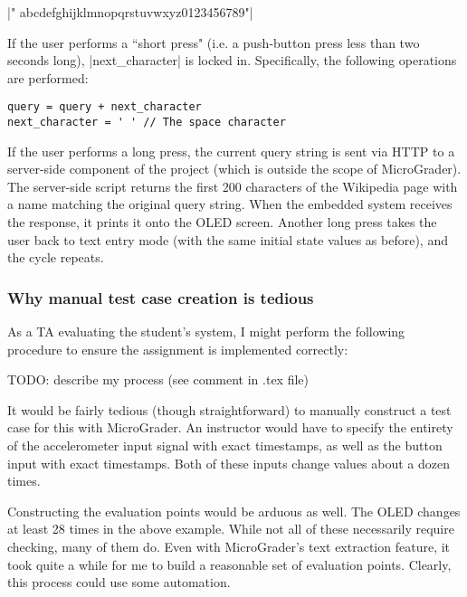 \documentclass[12pt]{article}
\begin{document}
|" abcdefghijklmnopqrstuvwxyz0123456789"|

If the user performs a ``short press" (i.e. a push-button press less than two seconds long), |next_character| is locked in.  Specifically, the following operations are performed:

\begin{lstlisting}
query = query + next_character
next_character = ' ' // The space character
\end{lstlisting}

If the user performs a long press, the current query string is sent via HTTP to a server-side component of the project (which is outside the scope of MicroGrader).  The server-side script returns the first 200 characters of the Wikipedia page with a name matching the original query string.  When the embedded system receives the response, it prints it onto the OLED screen.  Another long press takes the user back to text entry mode (with the same initial state values as before), and the cycle repeats.

\subsubsection{Why manual test case creation is tedious}
As a TA evaluating the student's system, I might perform the following procedure to ensure the assignment is implemented correctly:

TODO: describe my process (see comment in .tex file)

It would be fairly tedious (though straightforward) to manually construct a test case for this with MicroGrader.  An instructor would have to specify the entirety of the accelerometer input signal with exact timestamps, as well as the button input with exact timestamps.  Both of these inputs change values about a dozen times.

Constructing the evaluation points would be arduous as well.  The OLED changes at least 28 times in the above example.  While not all of these necessarily require checking, many of them do.  Even with MicroGrader's text extraction feature, it took quite a while for me to build a reasonable set of evaluation points.   Clearly, this process could use some automation.
\end{document}
